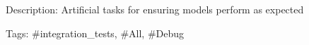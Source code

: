 Description\+: Artificial tasks for ensuring models perform as expected

Tags\+: \#integration\+\_\+tests, \#\+All, \#\+Debug 